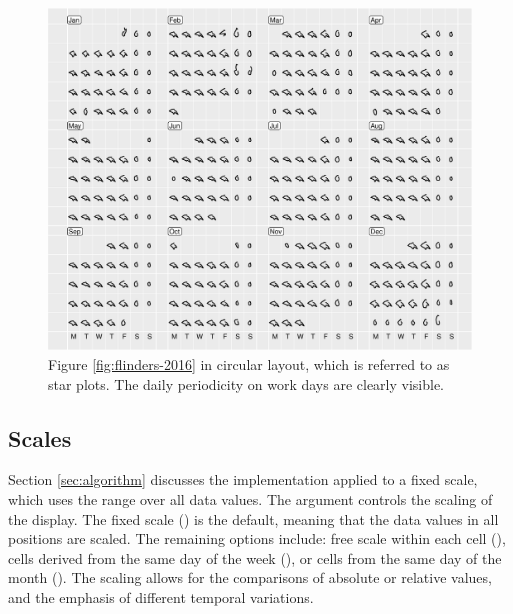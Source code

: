 \documentclass[article]{jss}
\theoremstyle{definition}
\theoremstyle{definition}
\theoremstyle{remark}
\begin{document}
\begin{CodeChunk}
\begin{figure}

{\centering \includegraphics[width=\textwidth]{figure/flinders-polar-1} 

}

\caption[Figure \ref{fig:flinders-2016} in circular
layout, which is referred to as star plots. The daily periodicity on
work days are clearly visible.]{Figure \ref{fig:flinders-2016} in circular
layout, which is referred to as star plots. The daily periodicity on
work days are clearly visible.}\label{fig:flinders-polar}
\end{figure}
\end{CodeChunk}





\subsection{Scales}\label{scales}

Section \ref{sec:algorithm} discusses the implementation applied to a
fixed scale, which uses the range over all data values. The 
argument controls the scaling of the display. The fixed scale
() is the default, meaning that the data values in all
positions are scaled. The remaining options include: free scale within
each cell (), cells derived from the same day of the week
(), or cells from the same day of the month
(). The scaling allows for the comparisons of absolute
or relative values, and the emphasis of different temporal variations.
\end{document}
